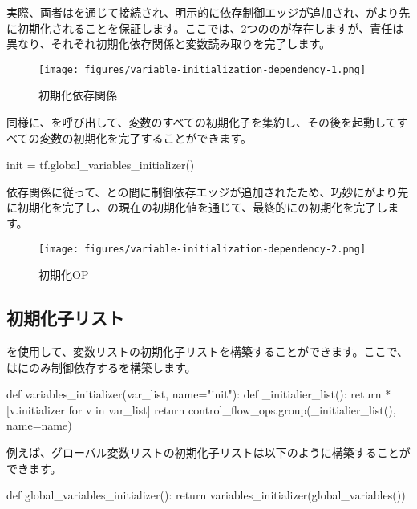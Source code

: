 \begin{content}
実際、両者はを通じて接続され、明示的に依存制御エッジが追加され、がより先に初期化されることを保証します。ここでは、2つののが存在しますが、責任は異なり、それぞれ初期化依存関係と変数読み取りを完了します。

\begin{figure}[!h]
\centering
\texttt{[image: figures/variable-initialization-dependency-1.png]}
\caption{初期化依存関係}
 \label{fig:variable-initialization-dependency-1}
\end{figure}

同様に、を呼び出して、変数のすべての初期化子を集約し、その後を起動してすべての変数の初期化を完了することができます。

\begin{leftbar}
\begin{python}
init = tf.global_variables_initializer()
\end{python}
\end{leftbar}

依存関係に従って、との間に制御依存エッジが追加されたため、巧妙にがより先に初期化を完了し、の現在の初期化値を通じて、最終的にの初期化を完了します。

\begin{figure}[!h]
\centering
\texttt{[image: figures/variable-initialization-dependency-2.png]}
\caption{初期化OP}
 \label{fig:variable-initialization-dependency-2}
\end{figure}

\subsection{初期化子リスト}

を使用して、変数リストの初期化子リストを構築することができます。ここで、はにのみ制御依存するを構築します。

\begin{leftbar}
\begin{python}
def variables_initializer(var_list, name="init"):
  def _initialier_list():
    return *[v.initializer for v in var_list]
  return control_flow_ops.group(_initialier_list(), name=name)
\end{python}
\end{leftbar}

例えば、グローバル変数リストの初期化子リストは以下のように構築することができます。

\begin{leftbar}
\begin{python}
def global_variables_initializer():
  return variables_initializer(global_variables())
\end{python}
\end{leftbar}

\end{content}

